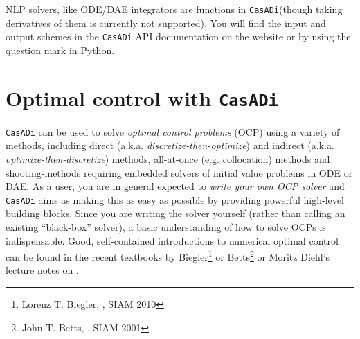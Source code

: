 \documentclass[a4paper,12pt]{book}
\newcommand{\CasADi}{\texttt{CasADi}\xspace}
\begin{document}
NLP solvers, like ODE/DAE integrators are functions in \CasADi (though taking derivatives of them is currently not supported). You will find the input and output schemes in the \CasADi API documentation on the website or by using the question mark in Python.

\chapter{Optimal control with \CasADi}
\CasADi can be used to solve \emph{optimal control problems} (OCP) using a variety of methods, including direct (a.k.a. \emph{discretize-then-optimize}) and indirect (a.k.a. \emph{optimize-then-discretize}) methods, all-at-once (e.g. collocation) methods and shooting-methods requiring embedded solvers of initial value problems in ODE or DAE. As a user, you are in general expected to \emph{write your own OCP solver} and \CasADi aims as making this as easy as possible by providing powerful high-level building blocks. Since you are writing the solver yourself (rather than calling an existing ``black-box'' solver), a basic understanding of how to solve OCPs is indispensable. Good, self-contained introductions to numerical optimal control can be found in the recent textbooks by Biegler\footnote{Lorenz T. Biegler, \emph{}, SIAM 2010} or Betts\footnote{John T. Betts, \emph{}, SIAM 2001} or Moritz Diehl's lecture notes on .
\end{document}
